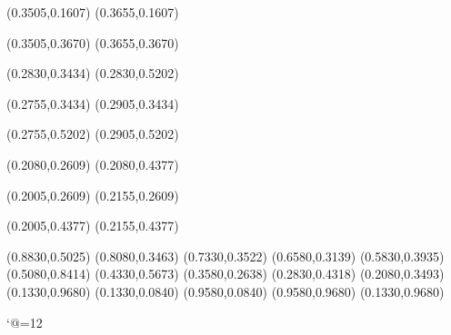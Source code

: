 \PST@Solid(0.3505,0.1607)
(0.3655,0.1607)

\PST@Solid(0.3505,0.3670)
(0.3655,0.3670)

\PST@Solid(0.2830,0.3434)
(0.2830,0.5202)

\PST@Solid(0.2755,0.3434)
(0.2905,0.3434)

\PST@Solid(0.2755,0.5202)
(0.2905,0.5202)

\PST@Solid(0.2080,0.2609)
(0.2080,0.4377)

\PST@Solid(0.2005,0.2609)
(0.2155,0.2609)

\PST@Solid(0.2005,0.4377)
(0.2155,0.4377)

\PST@Diamond(0.8830,0.5025)
\PST@Diamond(0.8080,0.3463)
\PST@Diamond(0.7330,0.3522)
\PST@Diamond(0.6580,0.3139)
\PST@Diamond(0.5830,0.3935)
\PST@Diamond(0.5080,0.8414)
\PST@Diamond(0.4330,0.5673)
\PST@Diamond(0.3580,0.2638)
\PST@Diamond(0.2830,0.4318)
\PST@Diamond(0.2080,0.3493)
\PST@Border(0.1330,0.9680)
(0.1330,0.0840)
(0.9580,0.0840)
(0.9580,0.9680)
(0.1330,0.9680)

\catcode`@=12
\fi
\endpspicture
